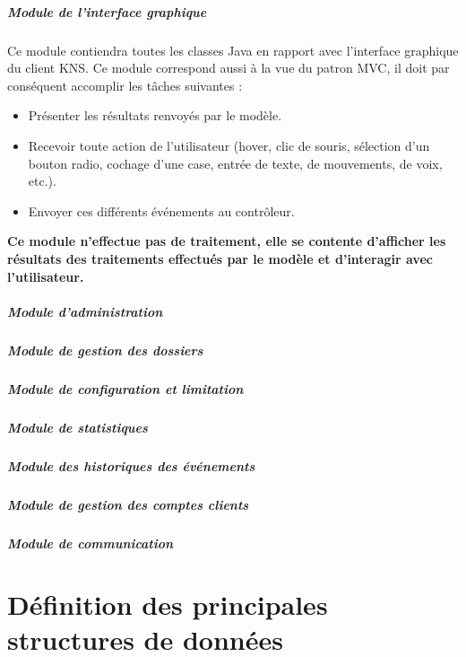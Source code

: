 \documentclass[10pt,a4paper]{report}
\begin{document}
				\subparagraph{Module de l'interface graphique}
				\begin{flushleft}
				Ce module contiendra toutes les classes Java en rapport avec l'interface graphique du client KNS. Ce module correspond aussi à la vue du patron MVC, il doit par conséquent accomplir les tâches suivantes :\\
					
					\begin{itemize}
						\item Présenter les résultats renvoyés par le modèle.
						\item Recevoir toute action de l'utilisateur (hover, clic de souris, sélection d'un bouton radio, cochage d'une case, entrée de texte, de mouvements, de voix, etc.).
						\item Envoyer ces différents événements au contrôleur. 
					\end{itemize}
					
					\textbf{Ce module n'effectue pas de traitement, elle se contente d'afficher les résultats des traitements effectués par le modèle et d'interagir avec l'utilisateur.}\\
				\end{flushleft}
				
				\subparagraph{Module d'administration}
				\begin{flushleft}
				\end{flushleft}
	
				\subparagraph{Module de gestion des dossiers}
				\begin{flushleft}
				\end{flushleft}
	
				\subparagraph{Module de configuration et limitation}	
				\begin{flushleft}
				\end{flushleft}
	
				\subparagraph{Module de statistiques}
				\begin{flushleft}
				\end{flushleft}
	
				\subparagraph{Module des historiques des événements}
	
	
				\subparagraph{Module de gestion des comptes clients}
	
	
				\subparagraph{Module de communication}

\section{Définition des principales structures de données}
\end{document}
